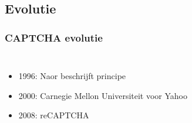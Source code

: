 \documentclass{beamer}
\begin{document}
\subsection{Evolutie}
\begin{frame}
  \frametitle{CAPTCHA evolutie}
  \begin{columns}[c]
       \begin{itemize}
         \item<+-> 1996: Naor beschrijft principe
  	     \item<+-> 2000: Carnegie Mellon Universiteit voor Yahoo
  	     \item<+-> 2008: reCAPTCHA
       \end{itemize}
      \begin{center}
      \end{center}
  \end{columns}
\end{frame}
\end{document}
